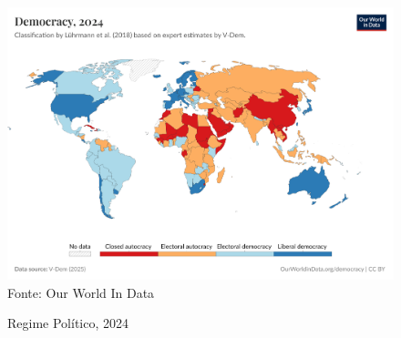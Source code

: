 \begin{figure}[ht]
    \centering
    \caption{Regime Político, 2024}
    \includegraphics[width=1\linewidth]{figuras/democracia/political-regime.png}
    \label{fig:political-regime}
    \footnotesize{Fonte: Our World In Data}
\end{figure}